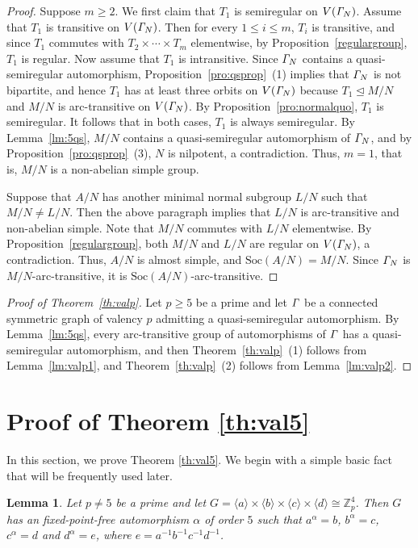 \documentclass[12pt,reqno]{amsart}
\renewcommand\a{\alpha}  \renewcommand\b{\beta}
\def\soc{ \mathrm{Soc}}
\newcommand\mz{\mathbb{Z}}
\numberwithin {equation} {section}
\newtheorem{lemma}[theorem]{Lemma}
\begin{document}
\begin{proof}
Suppose $m\geq 2$. We first claim that $T_1$ is semiregular on $V({\it \Gamma}_N)$. Assume that $T_1$ is transitive on $V({\it \Gamma}_N)$. Then for every $1\leq i\leq m$, $T_i$ is transitive, and since $T_1$ commutes with $T_2\times\cdots\times T_m$ elementwise, by Proposition~\ref{regulargroup}, $T_1$ is regular. Now assume that $T_1$ is intransitive. Since ${\it \Gamma}_N$ contains a quasi-semiregular automorphism, Proposition~\ref{pro:qsprop}~(1) implies that ${\it \Gamma}_N$ is not bipartite, and hence $T_1$ has at least three orbits on $V({\it \Gamma}_N)$ because $T_1\unlhd M/N$ and $M/N$ is arc-transitive on $V({\it \Gamma}_N)$. By Proposition~\ref{pro:normalquo}, $T_1$ is semiregular. It follows that in both cases, $T_1$ is always semiregular. By Lemma~\ref{lm:5qs}, $M/N$ contains a quasi-semiregular automorphism of ${\it \Gamma}_N$, and by Proposition~\ref{pro:qsprop}~(3), $N$ is nilpotent, a contradiction. Thus, $m=1$, that is, $M/N$ is a non-abelian simple group.

Suppose that $A/N$ has another minimal normal subgroup $L/N$ such that $M/N\not=L/N$. Then the above paragraph implies that $L/N$ is  arc-transitive and non-abelian simple. Note that $M/N$ commutes with $L/N$ elementwise. By Proposition~\ref{regulargroup}, both $M/N$ and $L/N$ are regular on $V({\it \Gamma}_N)$, a contradiction. Thus, $A/N$ is almost simple, and $\soc(A/N)=M/N$. Since ${\it \Gamma}_N$ is $M/N$-arc-transitive, it is $\soc(A/N)$-arc-transitive.
\end{proof}

\begin{proof}[Proof of Theorem~\ref{th:valp}] Let $p\geq 5$ be a prime and let ${\it \Gamma}$ be a connected symmetric graph of valency $p$ admitting a quasi-semiregular automorphism. By Lemma~\ref{lm:5qs}, every arc-transitive group of automorphisms of ${\it \Gamma}$ has a quasi-semiregular automorphism, and then Theorem~\ref{th:valp}~(1) follows from Lemma~\ref{lm:valp1}, and Theorem~\ref{th:valp}~(2) follows from Lemma~\ref{lm:valp2}.
\end{proof}

\section{Proof of Theorem \ref{th:val5}} \label{sec:th3}

In this section, we prove Theorem \ref{th:val5}. We begin with a simple basic fact that will be frequently used later.

\begin{lemma}\label{lm:p45qs} Let $p\not=5$ be a prime and let $G=\langle a\rangle\times\langle b\rangle\times\langle c\rangle\times\langle d\rangle\cong\mz_p^4$. Then $G$ has an fixed-point-free automorphism $\a$ of order $5$ such that $a^\a=b$, $b^\a=c$, $c^\a=d$ and $d^\a=e$, where $e=a^{-1}b^{-1}c^{-1}d^{-1}$.
\end{lemma}
\end{document}
